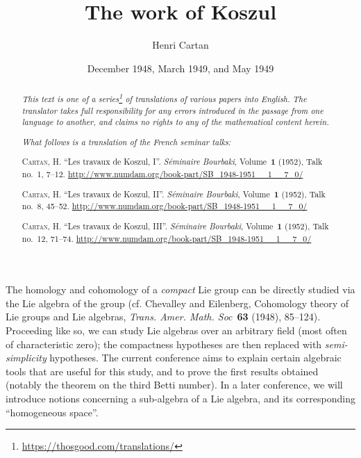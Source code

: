 \documentclass{article}
\title{The work of Koszul}
\author{Henri Cartan}
\date{December 1948, March 1949, and May 1949}
\newcommand{\oldpage}[1]{\marginpar{\footnotesize$\Big\vert$ \textit{p.~#1}}}
\begin{document}
\maketitle
\thispagestyle{fancy}

\renewcommand{\abstractname}{Translator's note.}

\begin{abstract}
  \renewcommand*{\thefootnote}{\fnsymbol{footnote}}
  \emph{This text is one of a series\footnote{\url{https://thosgood.com/translations/}} of translations of various papers into English.}
  \emph{The translator takes full responsibility for any errors introduced in the passage from one language to another, and claims no rights to any of the mathematical content herein.}
  
  \emph{What follows is a translation of the French seminar talks:}

  \medskip\noindent
  \textsc{Cartan, H.}
  ``Les travaux de Koszul, I''.
  \emph{S\'{e}minaire Bourbaki}, Volume~\textbf{1} (1952), Talk no.~1, 7--12.
  {\url{http://www.numdam.org/book-part/SB_1948-1951__1__7_0/}}

  \medskip\noindent
  \textsc{Cartan, H.}
  ``Les travaux de Koszul, II''.
  \emph{S\'{e}minaire Bourbaki}, Volume~\textbf{1} (1952), Talk no.~8, 45--52.
  {\url{http://www.numdam.org/book-part/SB_1948-1951__1__7_0/}}

  \medskip\noindent
  \textsc{Cartan, H.}
  ``Les travaux de Koszul, III''.
  \emph{S\'{e}minaire Bourbaki}, Volume~\textbf{1} (1952), Talk no.~12, 71--74.
  {\url{http://www.numdam.org/book-part/SB_1948-1951__1__7_0/}}
\end{abstract}

\setcounter{footnote}{0}

\tableofcontents
\bigskip



\part{}

\oldpage{7}
The homology and cohomology of a \emph{compact} Lie group can be directly studied via the Lie algebra of the group (cf. {\sc Chevalley and Eilenberg}, Cohomology theory of Lie groups and Lie algebras, \emph{Trans. Amer. Math. Soc}~\textbf{63} (1948), 85--124).
Proceeding like so, we can study Lie algebras over an arbitrary field (most often of characteristic zero);
the compactness hypotheses are then replaced with \emph{semi-simplicity} hypotheses.
The current conference aims to explain certain algebraic tools that are useful for this study, and to prove the first results obtained (notably the theorem on the third Betti number).
In a later conference, we will introduce notions concerning a sub-algebra of a Lie algebra, and its corresponding ``homogeneous space''.
\end{document}
